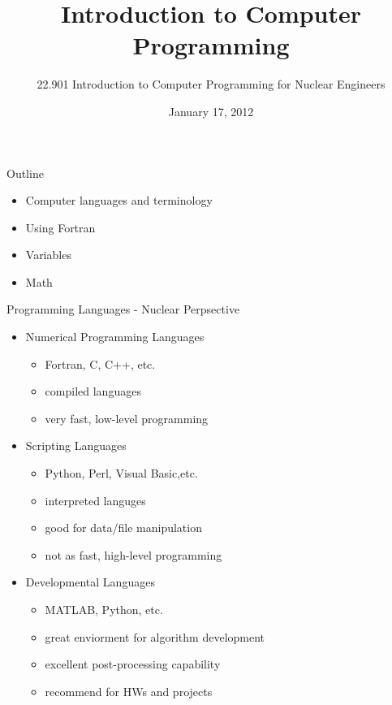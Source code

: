 \documentclass{beamer}
\title[Introduction to Computer Programming]{Introduction to Computer Programming}
\author[]{22.901 Introduction to Computer Programming for Nuclear Engineers}
\institute[\insertpagenumber]{}
\date{January 17, 2012}
\begin{document}

\frame{\titlepage}

\begin{frame}{Outline}
  \begin{itemize}
    \item Computer languages and terminology
    \vfill\item Using Fortran
    \vfill\item Variables
    \vfill\item Math
  \end{itemize}
\end{frame}
\begin{frame}{Programming Languages - Nuclear Perpsective}
\begin{itemize}

  \item Numerical Programming Languages
  \begin{itemize}
      \item Fortran, C, C++, etc.
      \item compiled languages
      \item very fast, low-level programming
  \end{itemize}

  \item Scripting Languages
    \begin{itemize}
      \item Python, Perl, Visual Basic,etc.
      \item interpreted languges
      \item good for data/file manipulation
      \item not as fast, high-level programming
    \end{itemize}

  \item Developmental Languages
    \begin{itemize}
      \item MATLAB, Python, etc.
      \item great enviorment for algorithm development
      \item excellent post-processing capability
      \item recommend for HWs and projects
    \end{itemize}

\end{itemize}
\end{frame}
\end{document}
